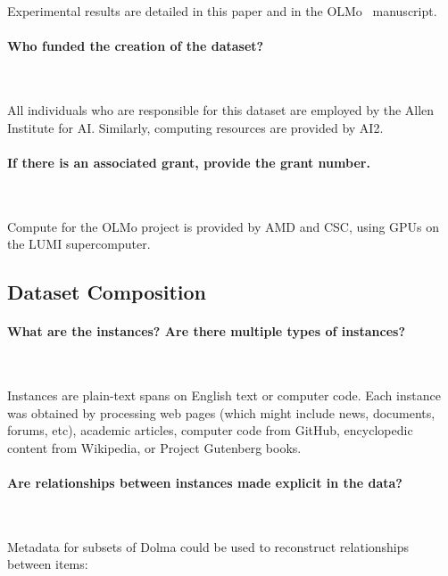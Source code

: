 \documentclass{article}
\newcommand{\dolma}{Dolma\xspace}
\newcommand{\olmo}{OLMo\xspace}
\begin{document}
Experimental results are detailed in this paper and in the \olmo~\citep{olmo20247b} manuscript.

\paragraph{Who funded the creation of the dataset?}~

All individuals who are responsible for this dataset are employed by the Allen Institute for AI. Similarly, computing resources are provided by AI2. 

\paragraph{If there is an associated grant, provide the grant number.}~

Compute for the \olmo project is provided by AMD and CSC, using GPUs on the LUMI supercomputer.

\subsection{Dataset Composition}

\paragraph{What are the instances? Are there multiple types of instances?}~

Instances are plain-text spans on English text or computer code.
Each instance was obtained by processing web pages (which might include news, documents, forums, etc), academic articles, computer code from GitHub, encyclopedic content from Wikipedia, or Project Gutenberg books. 

\paragraph{Are relationships between instances made explicit in the data?}~

Metadata for subsets of \dolma could be used to reconstruct relationships between items:
\end{document}
